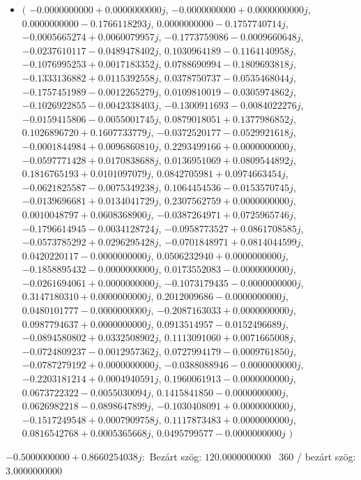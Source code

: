 \documentclass[14pt,a4paper]{article}
\begin{document}
\begin{itemize}
\item
$\big($
$-0.0000000000+0.0000000000j$, $-0.0000000000+0.0000000000j$, $0.0000000000-0.1766118293j$, $0.0000000000-0.1757740714j$, $-0.0005665274+0.0060079957j$, $-0.1773759086-0.0009660648j$, $-0.0237610117-0.0489478402j$, $0.1030964189-0.1164140958j$, $-0.1076995253+0.0017183352j$, $0.0788690994-0.1809693818j$, $-0.1333136882+0.0115392558j$, $0.0378750737-0.0535468044j$, $-0.1757451989-0.0012265279j$, $0.0109810019-0.0305974862j$, $-0.1026922855-0.0042338403j$, $-0.1300911693-0.0084022276j$, $-0.0159415806-0.0055001745j$, $0.0879018051+0.1377986852j$, $0.1026896720+0.1607733779j$, $-0.0372520177-0.0529921618j$, $-0.0001844984+0.0096860810j$, $0.2293499166+0.0000000000j$, $-0.0597771428+0.0170838688j$, $0.0136951069+0.0809544892j$, $0.1816765193+0.0101097079j$, $0.0842705981+0.0974663454j$, $-0.0621825587-0.0075349238j$, $0.1064454536-0.0153570745j$, $-0.0139696681+0.0134041729j$, $0.2307562759+0.0000000000j$, $0.0010048797+0.0608368900j$, $-0.0387264971+0.0725965746j$, $-0.1796614945-0.0034128724j$, $-0.0958773527+0.0861708585j$, $-0.0573785292+0.0296295428j$, $-0.0701848971+0.0814044599j$, $0.0420220117-0.0000000000j$, $0.0506232940+0.0000000000j$, $-0.1858895432-0.0000000000j$, $0.0173552083-0.0000000000j$, $-0.0261694061+0.0000000000j$, $-0.1073179435-0.0000000000j$, $0.3147180310+0.0000000000j$, $0.2012009686-0.0000000000j$, $0.0480101777-0.0000000000j$, $-0.2087163033+0.0000000000j$, $0.0987794637+0.0000000000j$, $0.0913514957-0.0152496689j$, $-0.0894580802+0.0332508902j$, $0.1113091060+0.0071665008j$, $-0.0724809237-0.0012957362j$, $0.0727994179-0.0009761850j$, $-0.0787279192+0.0000000000j$, $-0.0388088946-0.0000000000j$, $-0.2203181214+0.0004940591j$, $0.1960061913-0.0000000000j$, $0.0673722322-0.0055030094j$, $0.1415841850-0.0000000000j$, $0.0626982218-0.0898647899j$, $-0.1030408091+0.0000000000j$, $-0.1517249548+0.0007909758j$, $0.1117873483+0.0000000000j$, $0.0816542768+0.0005365668j$, $0.0495799577-0.0000000000j$
$\big)$
\end{itemize}
$-0.5000000000+0.8660254038j$:\
Bezárt szög: $120.0000000000$ \
360 / bezárt szög: $3.0000000000$\
\end{document}
